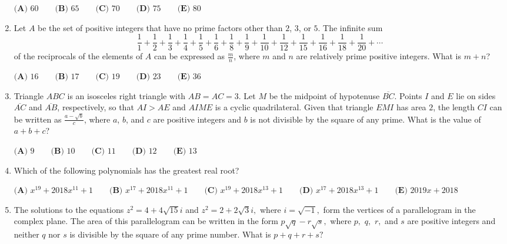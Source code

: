 \documentclass{article}
\begin{document}
\begin{enumerate}[label=\arabic*., itemsep=0.5em]
\(
\textbf{(A) }60 \qquad
\textbf{(B) }65 \qquad
\textbf{(C) }70 \qquad
\textbf{(D) }75 \qquad
\textbf{(E) }80 \qquad
\)\par \vspace{0.5em}\item Let \(A\) be the set of positive integers that have no prime factors other than \(2\), \(3\), or \(5\). The infinite sum 
\begin{equation*}
\frac{1}{1} + \frac{1}{2} + \frac{1}{3} + \frac{1}{4} + \frac{1}{5} + \frac{1}{6} + \frac{1}{8} + \frac{1}{9} + \frac{1}{10} + \frac{1}{12} + \frac{1}{15} + \frac{1}{16} + \frac{1}{18} + \frac{1}{20} + \cdots
\end{equation*}
of the reciprocals of the elements of \(A\) can be expressed as \(\frac{m}{n}\), where \(m\) and \(n\) are relatively prime positive integers. What is \(m+n\)?

\(\textbf{(A) } 16 \qquad \textbf{(B) } 17 \qquad \textbf{(C) } 19 \qquad \textbf{(D) } 23 \qquad \textbf{(E) } 36\)\par \vspace{0.5em}\item Triangle \(ABC\) is an isosceles right triangle with \(AB=AC=3\). Let \(M\) be the midpoint of hypotenuse \(\overline{BC}\). Points \(I\) and \(E\) lie on sides \(\overline{AC}\) and \(\overline{AB}\), respectively, so that \(AI>AE\) and \(AIME\) is a cyclic quadrilateral. Given that triangle \(EMI\) has area \(2\), the length \(CI\) can be written as \(\frac{a-\sqrt{b}}{c}\), where \(a\), \(b\), and \(c\) are positive integers and \(b\) is not divisible by the square of any prime. What is the value of \(a+b+c\)?

\(
\textbf{(A) }9 \qquad
\textbf{(B) }10 \qquad
\textbf{(C) }11 \qquad
\textbf{(D) }12 \qquad
\textbf{(E) }13 \qquad
\)\par \vspace{0.5em}\item Which of the following polynomials has the greatest real root?

\(\textbf{(A) }   x^{19}+2018x^{11}+1   \qquad        \textbf{(B) }   x^{17}+2018x^{11}+1   \qquad    \textbf{(C) }   x^{19}+2018x^{13}+1   \qquad   \textbf{(D) }  x^{17}+2018x^{13}+1 \qquad  \textbf{(E) }   2019x+2018 \)\par \vspace{0.5em}\item The solutions to the equations \(z^2=4+4\sqrt{15}i\) and \(z^2=2+2\sqrt 3i,\) where \(i=\sqrt{-1},\) form the vertices of a parallelogram in the complex plane. The area of this parallelogram can be written in the form \(p\sqrt q-r\sqrt s,\) where \(p,\) \(q,\) \(r,\) and \(s\) are positive integers and neither \(q\) nor \(s\) is divisible by the square of any prime number. What is \(p+q+r+s?\)


\end{enumerate}
\end{document}
